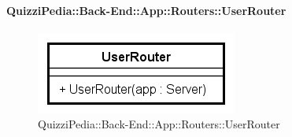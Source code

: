 \paragraph{QuizziPedia::Back-End::App::Routers::UserRouter}
\label{QuizziPedia::Back-End::App::Routers::UserRouter}
\begin{figure}[ht]
	\centering
	\includegraphics[scale=0.8]{UML/Classi/Back-End/QuizziPedia_Back-End_App_Routers_UserRouter.png}
	\caption{QuizziPedia::Back-End::App::Routers::UserRouter}
\end{figure}
\FloatBarrier
